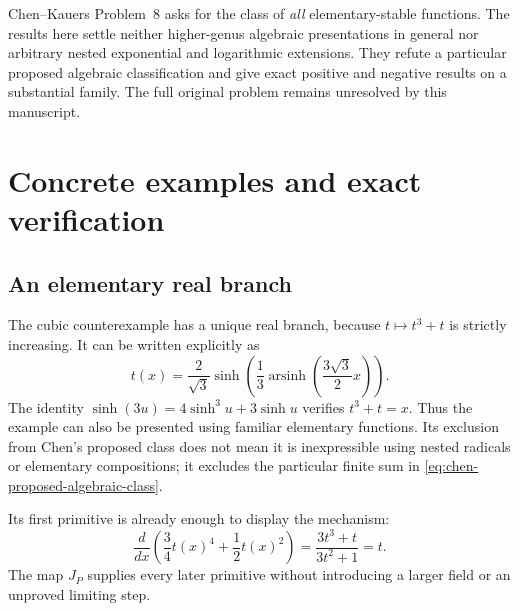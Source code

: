Chen--Kauers Problem~8 asks for the class of \emph{all} elementary-stable
functions. The results here settle neither higher-genus algebraic
presentations in general nor arbitrary nested exponential and logarithmic
extensions. They refute a particular proposed algebraic classification
and give exact positive and negative results on a substantial family.
The full original problem remains unresolved by this manuscript.

\section{Concrete examples and exact verification}
\subsection{An elementary real branch}
The cubic counterexample has a unique real branch, because
$t\mapsto t^3+t$ is strictly increasing. It can be written explicitly as
\begin{equation}\label{eq:real-cubic}
 t(x)=\frac2{\sqrt3}\sinh\!\left(
       \frac13\operatorname{arsinh}\!\left(\frac{3\sqrt3}{2}x\right)
       \right).
\end{equation}
The identity $\sinh(3u)=4\sinh^3u+3\sinh u$ verifies $t^3+t=x$.
Thus the example can also be presented using familiar elementary
functions. Its exclusion from Chen's proposed class does not mean it
is inexpressible using nested radicals or elementary compositions;
it excludes the particular finite sum in
\eqref{eq:chen-proposed-algebraic-class}.

Its first primitive is already enough to display the mechanism:
\[
 \frac{d}{dx}\left(\frac34t(x)^4+\frac12t(x)^2\right)
 =\frac{3t^3+t}{3t^2+1}=t.
\]
The map $J_P$ supplies every later primitive without introducing a
larger field or an unproved limiting step.

